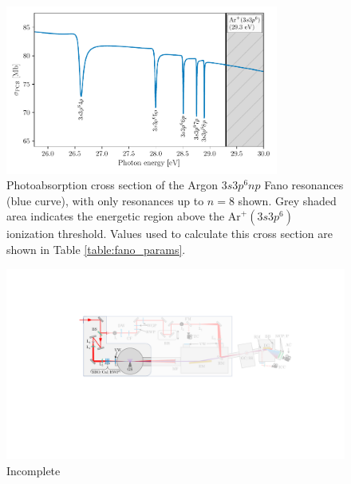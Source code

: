 \begin{figure}
	\centering
	\includegraphics[width=0.8\textwidth]{figures/ATS/fano_GS.pdf}
	\caption[Photoabsorption cross section of the Argon $3s3p^6np$ Fano resonances]{Photoabsorption cross section of the Argon $3s3p^6np$ Fano resonances (blue curve), with only resonances up to $n=8$ shown.  Grey shaded area indicates the energetic region above the $\mathrm{Ar}^+(3s3p^6)$ ionization threshold. Values used to calculate this cross section are shown in Table \ref{table:fano_params}.}
	\label{fig:fano_gs_pcs}
\end{figure}


\begin{figure}
	\centering
	\includegraphics[width=1.0\textwidth]{figures/ATS/generation_setup.pdf}
	\caption{Incomplete}
	\label{fig:generation_setup}
\end{figure}

